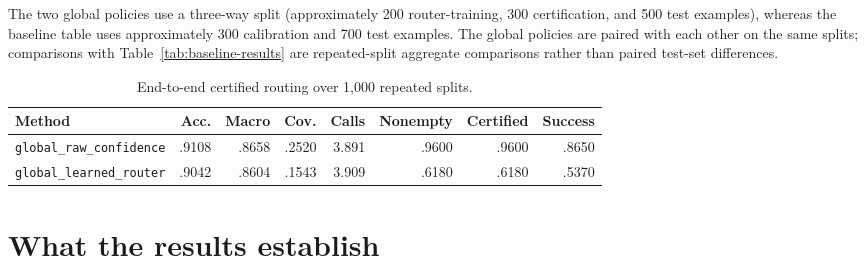 \documentclass[10pt]{article}
\DeclareRobustCommand{\method}[1]{\nolinkurl{#1}}
\begin{document}
The two global policies use a three-way split (approximately 200 router-training, 300
certification, and 500 test examples), whereas the baseline table uses approximately 300
calibration and 700 test examples. The global policies are paired with each other on the
same splits; comparisons with Table~\ref{tab:baseline-results} are repeated-split aggregate
comparisons rather than paired test-set differences.

\begin{table}[ht]
\centering
\caption{End-to-end certified routing over 1,000 repeated splits.}
\begin{tabular}{@{}lrrrrrrr@{}}
\toprule
\textbf{Method} & \textbf{Acc.} & \textbf{Macro} & \textbf{Cov.} & \textbf{Calls} & \textbf{Nonempty} & \textbf{Certified} & \textbf{Success} \\
\midrule
\method{global_raw_confidence} & .9108 & .8658 & .2520 & 3.891 & .9600 & .9600 & .8650 \\
\method{global_learned_router} & .9042 & .8604 & .1543 & 3.909 & .6180 & .6180 & .5370 \\
\bottomrule
\end{tabular}
\end{table}

\section{What the results establish}
\end{document}
